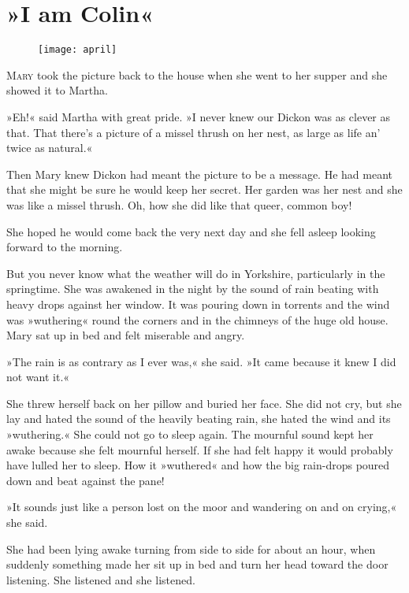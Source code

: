 \chapter{»I am Colin«} 
	
\begin{figure}[t!]
\centering
\texttt{[image: april]}
\end{figure}

	\lettrine[lines=6]{M}{ary} took the picture back to the house when she went to her supper and she showed it to Martha.

\zz
»Eh!« said Martha with great pride. »I never knew our Dickon was as clever as that. That there's a picture of a missel thrush on her nest, as large as life an' twice as natural.«

\zz
Then Mary knew Dickon had meant the picture to be a message. He had meant that she might be sure he would keep her secret. Her garden was her nest and she was like a missel thrush. Oh, how she did like that queer, common boy!

She hoped he would come back the very next day and she fell asleep looking forward to the morning.

But you never know what the weather will do in Yorkshire, particularly in the springtime. She was awakened in the night by the sound of rain beating with heavy drops against her window. It was pouring down in torrents and the wind was »wuthering« round the corners and in the chimneys of the huge old house. Mary sat up in bed and felt miserable and angry.

»The rain is as contrary as I ever was,« she said. »It came because it knew I did not want it.«

She threw herself back on her pillow and buried her face. She did not cry, but she lay and hated the sound of the heavily beating rain, she hated the wind and its »wuthering.« She could not go to sleep again. The mournful sound kept her awake because she felt mournful herself. If she had felt happy it would probably have lulled her to sleep. How it »wuthered« and how the big rain-drops poured down and beat against the pane!

»It sounds just like a person lost on the moor and wandering on and on crying,« she said.

She had been lying awake turning from side to side for about an hour, when suddenly something made her sit up in bed and turn her head toward the door listening. She listened and she listened.


